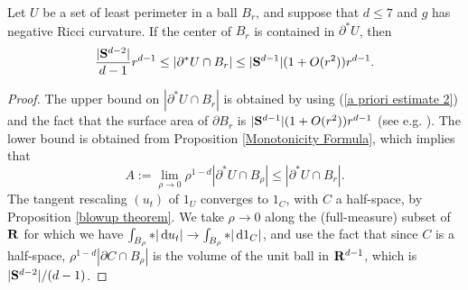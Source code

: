 \begin{proposition}\label{doubling dimension}
Let $U$ be a set of least perimeter in a ball $B_r$, and suppose that $d \leq 7$ and $g$ has negative Ricci curvature.
If the center of $B_r$ is contained in $\partial^* U$, then
$$\frac{|\mathbf S^{d - 2}|}{d - 1} r^{d - 1} \leq |\partial^*U \cap B_r| \leq |\mathbf S^{d - 1}|(1 + O(r^2))r^{d - 1}.$$
\end{proposition}
\begin{proof}
The upper bound on $|\partial^* U \cap B_r|$ is obtained by using (\ref{a priori estimate 2}) and the fact that the surface area of $\partial B_r$ is $|\mathbf S^{d - 1}|(1 + O(r^2))r^{d - 1}$ (see e.g. \cite{gray1974volume}).
The lower bound is obtained from Proposition \ref{Monotonicity Formula}, which implies that
$$A := \lim_{\rho \to 0} \rho^{1 - d} |\partial^* U \cap B_\rho| \leq |\partial^* U \cap B_r|.$$
The tangent rescaling $(u_t)$ of $1_U$ converges to $1_C$, with $C$ a half-space, by Proposition \ref{blowup theorem}.
We take $\rho \to 0$ along the (full-measure) subset of $\mathbf{R}$ for which we have $\int_{B_\rho} *|\mathop{}\!\mathrm{d} u_t| \to \int_{B_\rho} *|\mathop{}\!\mathrm{d} 1_C|$,
and use the fact that since $C$ is a half-space, $\rho^{1-d} |\partial C \cap B_\rho|$ is the volume of the unit ball in $\mathbf{R}^{d - 1}$, which is $|\mathbf S^{d - 2}|/(d - 1)$.
\end{proof}





